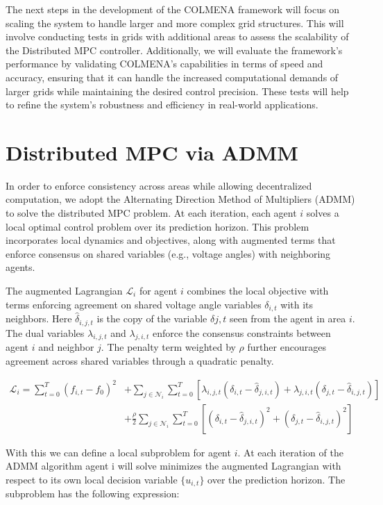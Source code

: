 \documentclass{article}
\begin{document}
The next steps in the development of the COLMENA framework will focus on scaling the system to handle larger and more complex grid structures. This will involve conducting tests in grids with additional areas to assess the scalability of the Distributed MPC controller. Additionally, we will evaluate the framework's performance by validating COLMENA's capabilities in terms of speed and accuracy, ensuring that it can handle the increased computational demands of larger grids while maintaining the desired control precision. These tests will help to refine the system's robustness and efficiency in real-world applications.

\appendix
\newpage
\section{Distributed MPC via ADMM}

In order to enforce consistency across areas while allowing decentralized computation, we adopt the Alternating Direction Method of Multipliers (ADMM) to solve the distributed MPC problem. At each iteration, each agent $i$ solves a local optimal control problem over its prediction horizon. This problem incorporates local dynamics and objectives, along with augmented terms that enforce consensus on shared variables (e.g., voltage angles) with neighboring agents.

The augmented Lagrangian $\mathcal{L}_i$ for agent $i$ combines the local objective with terms enforcing agreement on shared voltage angle variables $\delta_{i,t}$ with its neighbors. Here $\hat{\delta}_{i,j,t}$ is the copy of the variable $\delta{j,t}$ seen from the agent in area $i$. The dual variables $\lambda_{i,j,t}$ and $\lambda_{j,i,t}$ enforce the consensus constraints between agent $i$ and neighbor $j$. The penalty term weighted by $\rho$ further encourages agreement across shared variables through a quadratic penalty.
 
\begin{align}
    \mathcal{L}_i = \sum_{t=0}^{T} (f_{i,t} - f_0)^2 &+ \sum_{j \in \mathcal{N}_i} \sum_{t=0}^T \left[ \lambda_{i,j,t} (\delta_{i,t} - \hat{\delta}_{j,i,t}) + \lambda_{j,i,t} (\delta_{j,t} - \hat{\delta}_{i,j,t}) \right] \nonumber \\
    &+ \frac{\rho}{2} \sum_{j \in \mathcal{N}_i} \sum_{t=0}^T \left[ (\delta_{i,t} - \hat{\delta}_{j,i,t})^2 + (\delta_{j,t} - \hat{\delta}_{i,j,t})^2 \right]
\end{align}

With this we can define a local subproblem for agent $i$. At each iteration of the ADMM algorithm agent i will solve minimizes the augmented Lagrangian with respect to its own local decision variable $\{u_{i,t}\}$ over the prediction horizon. The subproblem has the following expression:
\end{document}
